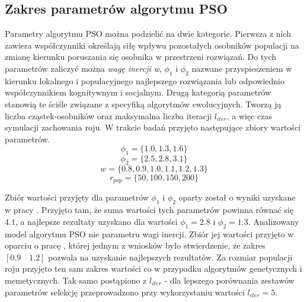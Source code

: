 \subsection{Zakres parametrów algorytmu PSO}
\par
Parametry algorytmu PSO można podzielić na dwie kategorie. Pierwsza z nich zawiera współczynniki określają siłę wpływu pozostałych osobników populacji na zmianę kierunku poruszania się osobnika w przestrzeni rozwiązań. Do tych parametrów zaliczyć można \emph{wagę inercji w}, $\phi_1$ i $\phi_2$ nazwane przyspieszeniem w kierunku lokalnego i populacyjnego najlepszego rozwiązania lub odpowiednio współczynnikiem kognitywnym i socjalnym. Drugą kategorią parametrów stanowią te ściśle związane z specyfiką algorytmów ewolucyjnych. Tworzą ją liczba cząstek-osobników oraz maksymalna liczba iteracji $l_{iter}$, a więc czas symulacji zachowania roju. W trakcie badań przyjęto następujące zbiory wartości parametrów.
\[\phi_1 = \lbrace1.0, 1.3, 1.6 \rbrace\]
\[\phi_2 = \lbrace2.5, 2.8, 3.1\rbrace\]
\[w = \lbrace0.8, 0.9, 1.0, 1.1, 1.2, 1.3\rbrace\]
\[r_{pop} = \lbrace50, 100, 150, 200\rbrace\]

\par
Zbiór wartości przyjęty dla parametrów $\phi_1$ i $\phi_2$ oparty został o wyniki uzyskane w pracy \cite{carlisle2002applying}. Przyjęto tam, że suma wartości tych parametrów powinna równać się $4.1$, a najlepsze rezultaty uzyskano dla wartości $\phi_1=2.8$ i $\phi_2=1.3$. Analizowany model algorytmu PSO nie parametru wagi inercji. Zbiór jej wartości przyjęto w oparciu o pracę \cite{shi1998modified}, której jednym z wniosków było stwierdzenie, że zakres $[0.9\quad1.2]$ pozwala na uzyskanie najlepszych rezultatów. Za rozmiar populacji roju przyjęto ten sam zakres wartości co w przypadku algorytmów genetycznych i memetycznych. Tak samo postąpiono z $l_{iter}$ - dla lepszego porównania zestawów parametrów selekcję przeprowadzono przy wykorzystaniu wartości $l_{iter}=5$.

